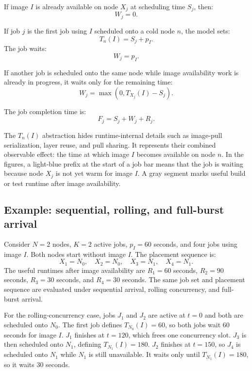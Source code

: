 \documentclass[11pt,a4paper]{article}
\begin{document}
If image \(I\) is already available on node \(X_j\) at scheduling time \(S_j\), then:
\begin{equation}
  W_j = 0.
\end{equation}

If job \(j\) is the first job using \(I\) scheduled onto a cold node \(n\), the model sets:
\begin{equation}
  T_n(I) = S_j + p_I.
\end{equation}
The job waits:
\begin{equation}
  W_j = p_I.
\end{equation}

If another job is scheduled onto the same node while image availability work is already in progress, it waits only for the remaining time:
\begin{equation}
  W_j = \max(0, T_{X_j}(I) - S_j).
\end{equation}

The job completion time is:
\begin{equation}
  F_j = S_j + W_j + R_j.
\end{equation}

The \(T_n(I)\) abstraction hides runtime-internal details such as image-pull serialization, layer reuse, and pull sharing. It represents their combined observable effect: the time at which image \(I\) becomes available on node \(n\). In the figures, a light-blue prefix at the start of a job bar means that the job is waiting because node \(X_j\) is not yet warm for image \(I\). A gray segment marks useful build or test runtime after image availability.

\subsection{Example: sequential, rolling, and full-burst arrival}

Consider \(N=2\) nodes, \(K=2\) active jobs, \(p_I=60\) seconds, and four jobs using image \(I\). Both nodes start without image \(I\). The placement sequence is:
\[
X_1=N_0,\quad X_2=N_0,\quad X_3=N_1,\quad X_4=N_1.
\]
The useful runtimes after image availability are \(R_1=60\) seconds, \(R_2=90\) seconds, \(R_3=30\) seconds, and \(R_4=30\) seconds. The same job set and placement sequence are evaluated under sequential arrival, rolling concurrency, and full-burst arrival.

For the rolling-concurrency case, jobs \(J_1\) and \(J_2\) are active at \(t=0\) and both are scheduled onto \(N_0\). The first job defines \(T_{N_0}(I)=60\), so both jobs wait 60 seconds for image \(I\). \(J_1\) finishes at \(t=120\), which frees one concurrency slot. \(J_3\) is then scheduled onto \(N_1\), defining \(T_{N_1}(I)=180\). \(J_2\) finishes at \(t=150\), so \(J_4\) is scheduled onto \(N_1\) while \(N_1\) is still unavailable. It waits only until \(T_{N_1}(I)=180\), so it waits 30 seconds.
\end{document}
